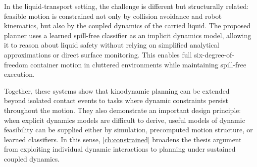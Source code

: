 In the liquid-transport setting, the challenge is different but structurally related: feasible motion is constrained not only by collision avoidance and robot kinematics, but also by the coupled dynamics of the carried liquid.
The proposed planner uses a learned spill-free classifier as an implicit dynamics model, allowing it to reason about liquid safety without relying on simplified analytical approximations or direct surface monitoring.
This enables full six-degree-of-freedom container motion in cluttered environments while maintaining spill-free execution.

Together, these systems show that kinodynamic planning can be extended beyond isolated contact events to tasks where dynamic constraints persist throughout the motion.
They also demonstrate an important design principle: when explicit dynamics models are difficult to derive, useful models of dynamic feasibility can be supplied either by simulation, precomputed motion structure, or learned classifiers.
In this sense, \cref{ch:constrained} broadens the thesis argument from exploiting individual dynamic interactions to planning under sustained coupled dynamics.




